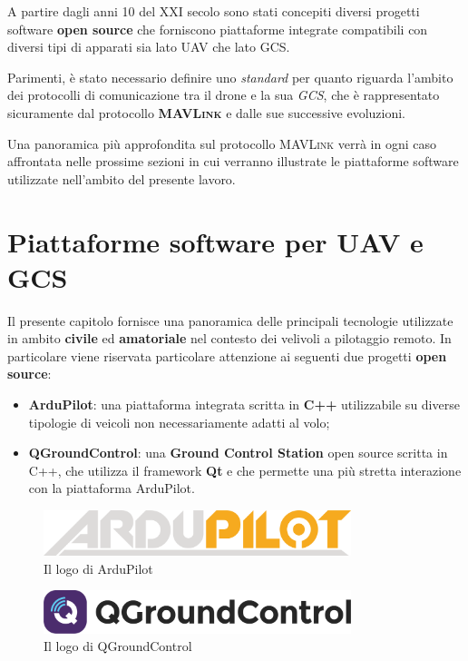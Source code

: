 \documentclass[a4paper, 12pt, oneside]{article}
\theoremstyle{definition}
\begin{document}
A partire dagli anni 10 del XXI secolo sono stati concepiti diversi progetti software \textbf{open source} che forniscono piattaforme integrate compatibili con diversi tipi di apparati sia lato UAV che lato GCS. 

Parimenti, è stato necessario definire uno \textit{standard} per quanto riguarda l'ambito dei protocolli di comunicazione tra il drone e la sua \textit{GCS}, che è rappresentato sicuramente dal protocollo \textbf{\textsc{MAVLink}} e dalle sue successive evoluzioni. 

Una panoramica più approfondita sul protocollo \textsc{MAVLink} verrà in ogni caso affrontata nelle prossime sezioni in cui verranno illustrate le piattaforme software utilizzate nell'ambito del presente lavoro.

\newpage

\section{Piattaforme software per UAV e GCS}
Il presente capitolo fornisce una panoramica delle principali tecnologie utilizzate in ambito \textbf{civile} ed \textbf{amatoriale} nel contesto dei velivoli a pilotaggio remoto. In particolare viene riservata particolare attenzione ai seguenti due progetti \textbf{open source}:

\begin{itemize}
    \item \textbf{ArduPilot}: una piattaforma integrata scritta in \textbf{C++} utilizzabile su diverse tipologie di veicoli non necessariamente adatti al volo;
    \item \textbf{QGroundControl}: una \textbf{Ground Control Station} open source scritta in C++, che utilizza il framework \textbf{Qt} e che permette una più stretta interazione con la piattaforma ArduPilot.
\end{itemize}

\begin{figure}[H]
    \centering
    \includegraphics[width=0.8\textwidth]{images/ardupilot_logo.png}
    \caption{Il logo di ArduPilot}
\end{figure}
\begin{figure}[H]
    \centering
    \includegraphics[width=0.8\textwidth]{images/QGC_RGB_Logo_Horizontal_Positive_PREFERRED.png}
    \caption{Il logo di QGroundControl}
\end{figure}
\end{document}
